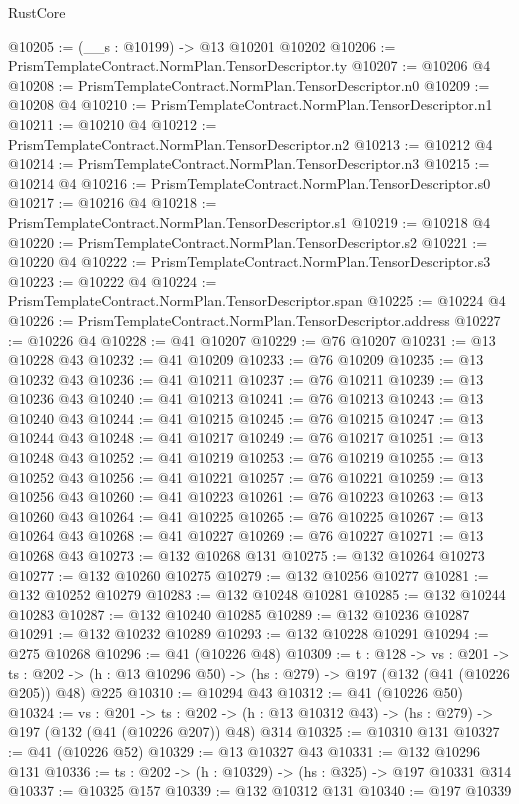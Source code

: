 \begin{lexlean}{RustCore}
\begin{coremodule}
@10205 := (__s : @10199) -> @13 @10201 @10202
@10206 := PrismTemplateContract.NormPlan.TensorDescriptor.ty
@10207 := @10206 @4
@10208 := PrismTemplateContract.NormPlan.TensorDescriptor.n0
@10209 := @10208 @4
@10210 := PrismTemplateContract.NormPlan.TensorDescriptor.n1
@10211 := @10210 @4
@10212 := PrismTemplateContract.NormPlan.TensorDescriptor.n2
@10213 := @10212 @4
@10214 := PrismTemplateContract.NormPlan.TensorDescriptor.n3
@10215 := @10214 @4
@10216 := PrismTemplateContract.NormPlan.TensorDescriptor.s0
@10217 := @10216 @4
@10218 := PrismTemplateContract.NormPlan.TensorDescriptor.s1
@10219 := @10218 @4
@10220 := PrismTemplateContract.NormPlan.TensorDescriptor.s2
@10221 := @10220 @4
@10222 := PrismTemplateContract.NormPlan.TensorDescriptor.s3
@10223 := @10222 @4
@10224 := PrismTemplateContract.NormPlan.TensorDescriptor.span
@10225 := @10224 @4
@10226 := PrismTemplateContract.NormPlan.TensorDescriptor.address
@10227 := @10226 @4
@10228 := @41 @10207
@10229 := @76 @10207
@10231 := @13 @10228 @43
@10232 := @41 @10209
@10233 := @76 @10209
@10235 := @13 @10232 @43
@10236 := @41 @10211
@10237 := @76 @10211
@10239 := @13 @10236 @43
@10240 := @41 @10213
@10241 := @76 @10213
@10243 := @13 @10240 @43
@10244 := @41 @10215
@10245 := @76 @10215
@10247 := @13 @10244 @43
@10248 := @41 @10217
@10249 := @76 @10217
@10251 := @13 @10248 @43
@10252 := @41 @10219
@10253 := @76 @10219
@10255 := @13 @10252 @43
@10256 := @41 @10221
@10257 := @76 @10221
@10259 := @13 @10256 @43
@10260 := @41 @10223
@10261 := @76 @10223
@10263 := @13 @10260 @43
@10264 := @41 @10225
@10265 := @76 @10225
@10267 := @13 @10264 @43
@10268 := @41 @10227
@10269 := @76 @10227
@10271 := @13 @10268 @43
@10273 := @132 @10268 @131
@10275 := @132 @10264 @10273
@10277 := @132 @10260 @10275
@10279 := @132 @10256 @10277
@10281 := @132 @10252 @10279
@10283 := @132 @10248 @10281
@10285 := @132 @10244 @10283
@10287 := @132 @10240 @10285
@10289 := @132 @10236 @10287
@10291 := @132 @10232 @10289
@10293 := @132 @10228 @10291
@10294 := @275 @10268
@10296 := @41 (@10226 @48)
@10309 := {t : @128} ->
  {vs : @201} ->
  {ts : @202} -> (h : @13 @10296 @50) -> (hs : @279) -> @197 (@132 (@41 (@10226 @205)) @48) @225
@10310 := @10294 @43
@10312 := @41 (@10226 @50)
@10324 := {vs : @201} ->
  {ts : @202} -> (h : @13 @10312 @43) -> (hs : @279) -> @197 (@132 (@41 (@10226 @207)) @48) @314
@10325 := @10310 @131
@10327 := @41 (@10226 @52)
@10329 := @13 @10327 @43
@10331 := @132 @10296 @131
@10336 := {ts : @202} -> (h : @10329) -> (hs : @325) -> @197 @10331 @314
@10337 := @10325 @157
@10339 := @132 @10312 @131
@10340 := @197 @10339

\end{coremodule}
\end{lexlean}
